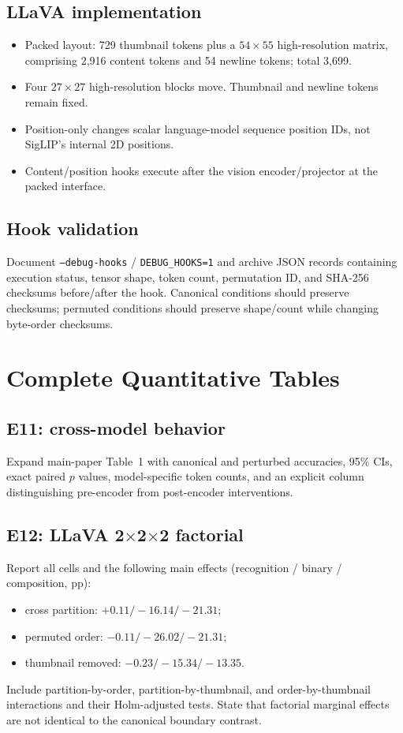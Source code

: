 \documentclass[10pt,twocolumn,letterpaper]{article}
\begin{document}
\subsection{LLaVA implementation}

\begin{itemize}[leftmargin=*]
    \item Packed layout: 729 thumbnail tokens plus a $54\times55$ high-resolution matrix, comprising 2,916 content tokens and 54 newline tokens; total 3,699.
    \item Four $27\times27$ high-resolution blocks move.  Thumbnail and newline tokens remain fixed.
    \item Position-only changes scalar language-model sequence position IDs, not SigLIP's internal 2D positions.
    \item Content/position hooks execute after the vision encoder/projector at the packed interface.
\end{itemize}

\subsection{Hook validation}

Document \texttt{--debug-hooks} / \texttt{DEBUG\_HOOKS=1} and archive JSON records containing execution status, tensor shape, token count, permutation ID, and SHA-256 checksums before/after the hook.
Canonical conditions should preserve checksums; permuted conditions should preserve shape/count while changing byte-order checksums.

\section{Complete Quantitative Tables}

\subsection{E11: cross-model behavior}
Expand main-paper Table~1 with canonical and perturbed accuracies, 95\% CIs, exact paired $p$ values, model-specific token counts, and an explicit column distinguishing pre-encoder from post-encoder interventions.

\subsection{E12: LLaVA 2$\times$2$\times$2 factorial}
Report all cells and the following main effects (recognition / binary / composition, pp):
\begin{itemize}[leftmargin=*]
    \item cross partition: $+0.11/-16.14/-21.31$;
    \item permuted order: $-0.11/-26.02/-21.31$;
    \item thumbnail removed: $-0.23/-15.34/-13.35$.
\end{itemize}
Include partition-by-order, partition-by-thumbnail, and order-by-thumbnail interactions and their Holm-adjusted tests.
State that factorial marginal effects are not identical to the canonical boundary contrast.
\end{document}

